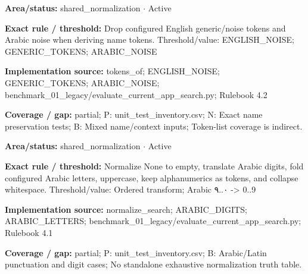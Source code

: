 \begin{tcolorbox}[enhanced,breakable,colback=white,colframe=Muted!45,boxrule=0.45pt,arc=1.5pt,left=6pt,right=6pt,top=5pt,bottom=5pt,title={\texttt{SH-NORM-TOKEN-02}},title after break={\texttt{SH-NORM-TOKEN-02}\ (continued)},fonttitle=\headingfont\bfseries\color{Navy},coltitle=Navy]
\textbf{Area/status:} shared\_\allowbreak{}normalization $\boldsymbol{\cdot}$ Active\par
\smallskip
\textbf{Exact rule / threshold:} Drop configured English generic/\allowbreak{}noise tokens and Arabic noise when deriving name tokens. Threshold/\allowbreak{}value: ENGLISH\_\allowbreak{}NOISE; GENERIC\_\allowbreak{}TOKENS; ARABIC\_\allowbreak{}NOISE\par
\smallskip
\textbf{Implementation source:} tokens\_\allowbreak{}of; ENGLISH\_\allowbreak{}NOISE; GENERIC\_\allowbreak{}TOKENS; ARABIC\_\allowbreak{}NOISE; benchmark\_\allowbreak{}01\_\allowbreak{}legacy/\allowbreak{}evaluate\_\allowbreak{}current\_\allowbreak{}app\_\allowbreak{}search.py; Rulebook 4.2\par
\smallskip
\textbf{Coverage / gap:} partial; P: unit\_\allowbreak{}test\_\allowbreak{}inventory.csv; N: Exact name preservation tests; B: Mixed name/\allowbreak{}context inputs; Token-list coverage is indirect.
\end{tcolorbox}
\begin{tcolorbox}[enhanced,breakable,colback=white,colframe=Muted!45,boxrule=0.45pt,arc=1.5pt,left=6pt,right=6pt,top=5pt,bottom=5pt,title={\texttt{SH-NORM-UNICODE-01}},title after break={\texttt{SH-NORM-UNICODE-01}\ (continued)},fonttitle=\headingfont\bfseries\color{Navy},coltitle=Navy]
\textbf{Area/status:} shared\_\allowbreak{}normalization $\boldsymbol{\cdot}$ Active\par
\smallskip
\textbf{Exact rule / threshold:} Normalize None to empty, translate Arabic digits, fold configured Arabic letters, uppercase, keep alphanumerics as tokens, and collapse whitespace. Threshold/\allowbreak{}value: Ordered transform; Arabic ٠..٩ -> 0..9\par
\smallskip
\textbf{Implementation source:} normalize\_\allowbreak{}search; ARABIC\_\allowbreak{}DIGITS; ARABIC\_\allowbreak{}LETTERS; benchmark\_\allowbreak{}01\_\allowbreak{}legacy/\allowbreak{}evaluate\_\allowbreak{}current\_\allowbreak{}app\_\allowbreak{}search.py; Rulebook 4.1\par
\smallskip
\textbf{Coverage / gap:} partial; P: unit\_\allowbreak{}test\_\allowbreak{}inventory.csv; B: Arabic/\allowbreak{}Latin punctuation and digit cases; No standalone exhaustive normalization truth table.
\end{tcolorbox}
\medskip
